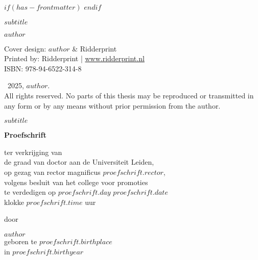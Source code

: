 
$if(has-frontmatter)$
\frontmatter
$endif$


\begin{titlepage}
  \hspace{0pt}
  \vfill
  \begin{center}
     \par %
    \smallskip
    \textsf{\Large $subtitle$} \par
    \vfill
    \textsf{\large $author$}
  \end{center}
\end{titlepage}


\clearpage
\thispagestyle{empty}
\vspace*{\fill} %

\begingroup
  \setlength{\parskip}{\baselineskip}
  \begin{flushleft}
    Cover design: $author$ \& Ridderprint \\
    Printed by: Ridderprint | \href{www.ridderprint.nl}{www.ridderprint.nl} \\
    ISBN: 978-94-6522-314-8\par

    \textcopyright \ 2025, $author$. \\
    All rights reserved. No parts of this thesis may be reproduced or transmitted in any form or by any means without prior permission from the author.
  \end{flushleft}
\endgroup


\clearpage
\thispagestyle{empty}

\begin{center}
   \par %
  \smallskip
  \textsf{\Large $subtitle$} \par
  \vfill
  \textbf{\large Proefschrift} \par
  \vspace{2\baselineskip}
  \large{
    ter verkrijging van \\
    de graad van doctor aan de Universiteit Leiden, \\
    op gezag van rector magnificus $proefschrift.rector$, \\
    volgens besluit van het college voor promoties \\
    te verdedigen op $proefschrift.day$ $proefschrift.date$ \\
    klokke $proefschrift.time$ uur
  } \par
  \vspace{2\baselineskip}
  \large{door} \par
  \vspace{2\baselineskip}
  \large{$author$} \\
  \normalsize{geboren te $proefschrift.birthplace$\\in $proefschrift.birthyear$} \par
\end{center}


